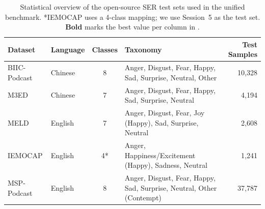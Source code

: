 \begin{table}[ht]
\centering
\small
\begin{tabular}{llcp{7.5cm}r}
\toprule
\textbf{Dataset} & \textbf{Language} & \textbf{Classes} & \textbf{Taxonomy} & \textbf{Test Samples} \\
\midrule
BIIC-Podcast & Chinese & 8 & Anger, Disgust, Fear, Happy, Sad, Surprise, Neutral, Other & 10{,}328 \\
M3ED         & Chinese & 7 & Anger, Disgust, Fear, Happy, Sad, Surprise, Neutral & 4{,}194 \\
MELD         & English & 7 & Anger, Disgust, Fear, Joy (Happy), Sad, Surprise, Neutral & 2{,}608 \\
IEMOCAP      & English & 4* & Anger, Happiness/Excitement (Happy), Sadness, Neutral & 1{,}241 \\
MSP-Podcast  & English & 8 & Anger, Disgust, Fear, Happy, Sad, Surprise, Neutral, Other (Contempt) & 37{,}787 \\
\bottomrule
\end{tabular}
\caption{Statistical overview of the open-source SER test sets used in the unified benchmark. *IEMOCAP uses a 4-class mapping; we use Session~5 as the test set. \textbf{Bold} marks the best value per column in .}
\label{tab:datasets}
\end{table}
